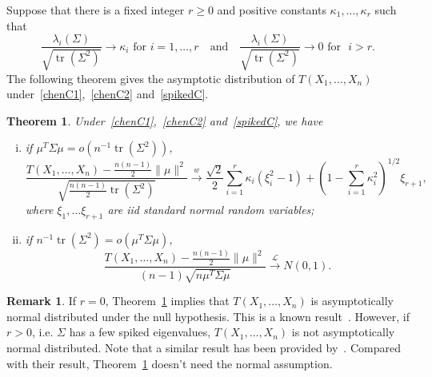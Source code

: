 \documentclass[3p]{elsarticle}
\DeclareMathOperator{\mytr}{tr}
\theoremstyle{plain}
\newtheorem{theorem}{\quad\quad Theorem}
\theoremstyle{definition}
\newtheorem{remark}{\quad\quad Remark}
\theoremstyle{remark}
\begin{document}
Suppose that there is a fixed integer $r\geq 0$ and positive constants $\kappa_1,\ldots,\kappa_r$ such that
\begin{equation}\label{spikedC}
    \frac{\lambda_{i}(\Sigma)}{\sqrt{\mytr(\Sigma^2)}}\to \kappa_i \text{ for } i=1,\ldots, r
    \quad
    \text{and}
    \quad
    \frac{\lambda_{i}(\Sigma)}{\sqrt{\mytr(\Sigma^2)}}\to 0 \text{ for }\,\, i> r.
\end{equation}
The following theorem gives the asymptotic distribution of $T(X_1,\ldots,X_n)$ under~\eqref{chenC1},~\eqref{chenC2} and~\eqref{spikedC}.
\begin{theorem}\label{prop:spiked1}
    Under~\eqref{chenC1},~\eqref{chenC2} and~\eqref{spikedC},
    we have
    \begin{enumerate}[(i)]
        \item
if $\mu^T \Sigma \mu=o(n^{-1}\mytr(\Sigma^2))$,
    $$
    \frac{T(X_1,\ldots,X_n)-\frac{n(n-1)}{2}\|\mu\|^2}{\sqrt{\frac{n(n-1)}{2}\mytr(\Sigma^2)}}
    \xrightarrow{w}
            \frac{\sqrt{2}}{2}\sum_{i=1}^r \kappa_i (\xi_i^2-1)+(1-\sum_{i=1}^r \kappa_i^2)^{1/2} \xi_{r+1},
    $$
            where $\xi_1,\ldots \xi_{r+1}$ are iid standard normal random variables;
\item
if $n^{-1}\mytr(\Sigma^2)=o(\mu^T \Sigma \mu)$,
$$
            \frac{T(X_1,\ldots,X_n)-\frac{n(n-1)}{2}\|\mu\|^2}{(n-1)\sqrt{n\mu^T \Sigma \mu}}\xrightarrow{\mathcal{L}}N(0,1).
            $$
    \end{enumerate}
\end{theorem}
\begin{remark}
    If $r=0$, Theorem~\ref{prop:spiked1} implies that $T(X_1,\ldots, X_n)$ is asymptotically normal distributed under the null hypothesis. This is a known result~\citep[Theorem 1]{Chen2010A}.
    However, if $r>0$, i.e. $\Sigma$ has a few spiked eigenvalues, $T(X_1,\ldots,X_n)$ is not asymptotically normal distributed.
    Note that a similar result has been provided by~\citet[Theorem 3.1]{KATAYAMA2013410}.
    Compared with their result, Theorem~\ref{prop:spiked1} doesn't need the normal assumption.
\end{remark}

    
\end{document}
